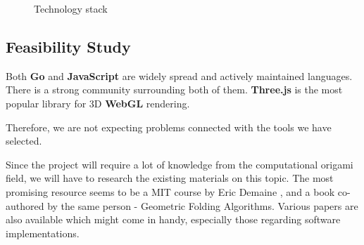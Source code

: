 \begin{figure}[H]
	\caption{Technology stack}
	\centering
\end{figure}


\subsection{Feasibility Study}

Both \textbf{Go} and \textbf{JavaScript} are widely spread and actively maintained languages.
There is a strong community surrounding both of them.
\textbf{Three.js} is the most popular library for 3D \textbf{WebGL} rendering.

Therefore, we are not expecting problems connected with the tools we have selected.

Since the project will require a lot of knowledge from the computational origami
field, we will have to research the existing materials on this topic.
The most promising resource seems to be a MIT course by
Eric Demaine \cite{mit-course}, and a book co-authored by the same person -
Geometric Folding Algorithms\cite{origami-book}.
Various papers are also available which might come in handy, especially those regarding software implementations.


